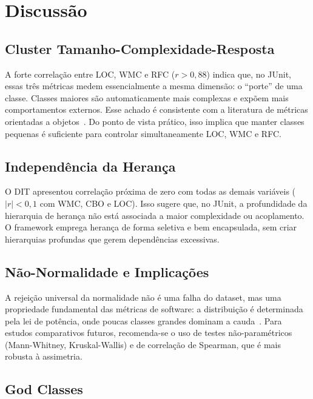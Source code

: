 \documentclass[12pt]{article}
\begin{document}
\section{Discussão}
\label{sec:discussao}

\subsection{Cluster Tamanho-Complexidade-Resposta}

A forte correlação entre LOC, WMC e RFC ($r > 0{,}88$) indica que, no
JUnit, essas três métricas medem essencialmente a mesma dimensão: o
``porte'' de uma classe. Classes maiores são automaticamente mais
complexas e expõem mais comportamentos externos. Esse achado é consistente
com a literatura de métricas orientadas a objetos~\cite{chidamber1994}.
Do ponto de vista prático, isso implica que manter classes pequenas é
suficiente para controlar simultaneamente LOC, WMC e RFC.

\subsection{Independência da Herança}

O DIT apresentou correlação próxima de zero com todas as demais variáveis
($|r| < 0{,}1$ com WMC, CBO e LOC). Isso sugere que, no JUnit, a
profundidade da hierarquia de herança não está associada a maior
complexidade ou acoplamento. O framework emprega herança de forma seletiva
e bem encapsulada, sem criar hierarquias profundas que gerem dependências
excessivas.

\subsection{Não-Normalidade e Implicações}

A rejeição universal da normalidade não é uma falha do dataset, mas uma
propriedade fundamental das métricas de software: a distribuição é
determinada pela lei de potência, onde poucas classes grandes dominam
a cauda~\cite{concas2007}. Para estudos comparativos futuros, recomenda-se
o uso de testes não-paramétricos (Mann-Whitney, Kruskal-Wallis) e de
correlação de Spearman, que é mais robusta à assimetria.

\subsection{God Classes}
\end{document}
